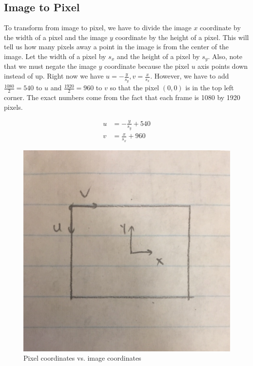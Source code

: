 \documentclass{article}
\begin{document}
\subsection{Image to Pixel}
To transform from image to pixel, we have to divide the image $x$ coordinate by the width of a pixel and the image $y$ coordinate by the height of a pixel. 
This will tell us how many pixels away a point in the image is from the center of the image.
 Let the width of a pixel by $s_{x}$ and the height of a pixel by $s_{y}$. 
 Also, note that we must negate the image $y$ coordinate because the pixel $u$ axis points down instead of up. 
 Right now we have $u=-\frac{y}{s_y}, v=\frac{x}{s_x}$. 
 However, we have to add $\frac{1080}{2}=540$ to $u$ and $\frac{1920}{2}=960$ to $v$ so that the pixel $(0,0)$ is in the top left corner. 
 The exact numbers come from the fact that each frame is 1080 by 1920 pixels.

\begin{align*}
u&=-\frac{y}{s_{y}}+540 \\
v&=\frac{x}{s_{x}}+960
\end{align*}

\begin{figure}[H]
\includegraphics[scale=0.3]{Pixel_Coordinates}
\centering
\caption*{Pixel coordinates vs. image coordinates}
\end{figure}
\end{document}
